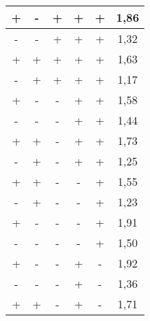 \begin{table}[H]
\begin{tabular}{|c|c|c|c|c|c|}
        +              & -               & +                & +                 & +                  & 1,86           \\ \hline
        \rowcolor[HTML]{EFEFEF} 
        -              & -               & +                & +                 & +                  & 1,32           \\ \hline
        +              & +               & +                & +                 & +                  & 1,63           \\ \hline
        \rowcolor[HTML]{EFEFEF} 
        -              & +               & +                & +                 & +                  & 1,17           \\ \hline
        +              & -               & -                & +                 & +                  & 1,58           \\ \hline
        \rowcolor[HTML]{EFEFEF} 
        -              & -               & -                & +                 & +                  & 1,44           \\ \hline
        +              & +               & -                & +                 & +                  & 1,73           \\ \hline
        \rowcolor[HTML]{EFEFEF} 
        -              & +               & -                & +                 & +                  & 1,25           \\ \hline
        +              & +               & -                & -                 & +                  & 1,55           \\ \hline
        \rowcolor[HTML]{EFEFEF} 
        -              & +               & -                & -                 & +                  & 1,23           \\ \hline
        +              & -               & -                & -                 & +                  & 1,91           \\ \hline
        \rowcolor[HTML]{EFEFEF} 
        -              & -               & -                & -                 & +                  & 1,50           \\ \hline
        +              & -               & -                & +                 & -                  & 1,92           \\ \hline
        \rowcolor[HTML]{EFEFEF} 
        -              & -               & -                & +                 & -                  & 1,36           \\ \hline
        +              & +               & -                & +                 & -                  & 1,71           \\ \hline

\end{tabular}
\end{table}
